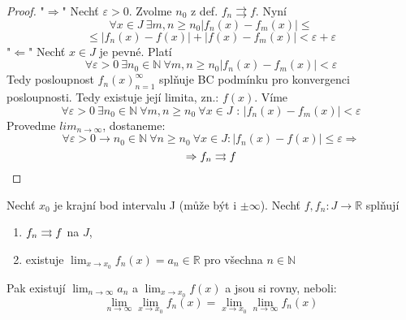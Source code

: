 \begin{proof}
"$\Rightarrow$" 
Nechť $\varepsilon > 0$. Zvolme $n_0$ z def. $f_n \rightrightarrows f$. 
Nyní 
$$\forall x \in J \ \exists m,n \geq n_0 |f_n(x) - f_m(x) | \leq $$
$$\leq |f_n(x) - f(x)| + |f(x) - f_m(x)| < \varepsilon + \varepsilon $$
"$\Leftarrow$"
Nechť $x \in J$ je pevné. Platí $$\forall \varepsilon > 0 \ \exists n_0 \in \mathbb{N} \ \forall m,n \geq n_0|f_n(x) - f_m(x)| < \varepsilon$$
Tedy posloupnost ${f_n(x)}_{n=1}^\infty$ splňuje BC podmínku pro konvergenci posloupnosti. Tedy existuje její limita, zn.: $f(x)$.
Víme $$\forall \varepsilon > 0 \ \exists n_0 \in \mathbb{N} \ \forall m,n \geq n_0 \ \forall x \in J \textrm{ : } |f_n(x)-f_m(x)|<\varepsilon$$
Provedme $lim_{n \to \infty}$, dostaneme:
$$\forall \varepsilon > 0 \rightarrow n_0 \in \mathbb{N} \ \forall n \geq n_0 \ \forall x \in J: |f_n(x) - f(x)| \leq \varepsilon \Rightarrow$$
$$\Rightarrow f_n \rightrightarrows f$$
\end{proof}

\begin{vetat}
Nechť $x_0$ je krajní bod intervalu J (může být i $\pm \infty$). Nechť $f, f_n : J \rightarrow \mathbb{R}$ splňují
\begin{enumerate}
\item $f_n \rightrightarrows f$ na $J$,
\item existuje $\lim_{x \rightarrow x_0} f_n(x) = a_n \in \mathbb{R}$ pro všechna $n \in \mathbb{N}$
\end{enumerate}
Pak existují $\lim_{n \rightarrow \infty} a_n$ a $\lim_{x \rightarrow x_0} f(x)$ a jsou si rovny, neboli:
$$\lim_{n \rightarrow \infty} \lim_{x \rightarrow x_0} f_n(x) = \lim_{x \rightarrow x_0} \lim_{n \rightarrow \infty} f_n(x)$$
\end{vetat}

